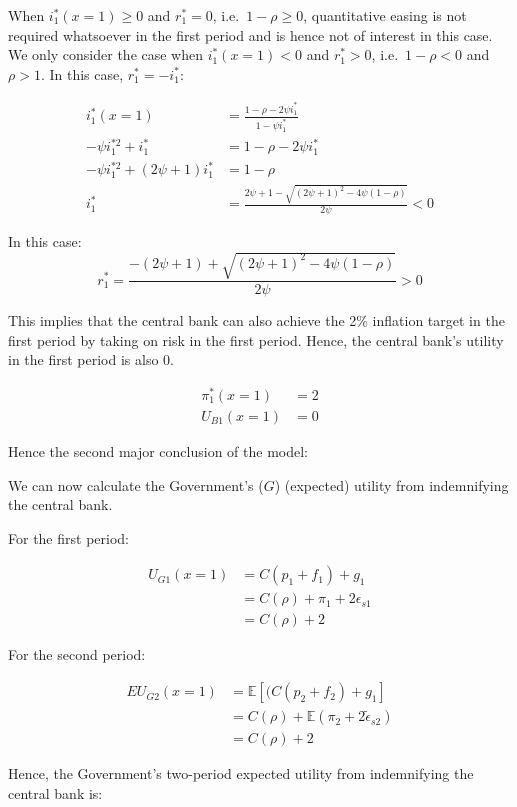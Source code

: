 \documentclass[
  a4paper,
  abstract=true]{scrartcl}
\theoremstyle{definition}
\begin{document}
When \(i^*_1(x=1)\geq0\) and \(r_1^*=0\), i.e.~\(1-\rho\geq0\),
quantitative easing is not required whatsoever in the first period and
is hence not of interest in this case. We only consider the case when
\(i^*_1(x=1)<0\) and \(r_1^*>0\), i.e.~\(1-\rho<0\) and \(\rho>1\). In
this case, \(r^*_1=-i^*_1\):

\begin{align*}
i_1^*(x=1)&=\frac{1-\rho-2\psi i^*_1}{1-\psi i^*_1} \\
-\psi i^{*2}_1 +i^*_1&=1-\rho-2\psi i^*_1 \\
-\psi i^{*2}_1 +(2\psi+1)i^*_1&=1-\rho \\
i^*_1&=\frac{2\psi+1-\sqrt{(2\psi+1)^2-4\psi(1-\rho)}}{2\psi}<0
\end{align*}

In this case: \[
r^*_1=\frac{-(2\psi+1)+\sqrt{(2\psi+1)^2-4\psi(1-\rho)}}{2\psi}>0
\]

This implies that the central bank can also achieve the 2\% inflation
target in the first period by taking on risk in the first period. Hence,
the central bank's utility in the first period is also 0.

\begin{align*}
\pi_1^*(x=1) &=2 \\
U_{B1}(x=1) &=0
\end{align*}

Hence the second major conclusion of the model:

\stabinf*

We can now calculate the Government's (\(G\)) (expected) utility from
indemnifying the central bank.

For the first period:

\begin{align*}
U_{G1}(x=1)&=C(p_1+f_1)+g_1 \\
&=C(\rho)+\pi_1+2\epsilon_{s1} \\
&=C(\rho)+2
\end{align*}

For the second period:

\begin{align*}
EU_{G2}(x=1)&=\mathbb{E}[(C(p_2+f_2)+g_1] \\
&=C(\rho)+\mathbb{E}(\pi_2+2\tilde\epsilon_{s2}) \\
&=C(\rho)+2
\end{align*}

Hence, the Government's two-period expected utility from indemnifying
the central bank is:
\end{document}
